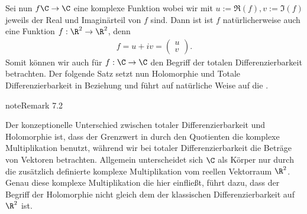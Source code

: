 \documentclass[letterpaper,10pt,german]{jupyterBook}
\begin{document}
\sphinxAtStartPar
Sei nun \(f\C\to\C\) eine komplexe Funktion wobei wir mit \(u:=\Re(f),v:=\Im(f)\) jeweils der Real\sphinxhyphen{} und Imaginärteil von \(f\) sind. Dann ist ist \(f\) natürlicherweise auch eine Funktion \(f:\R^2\to\R^2\), denn
\begin{equation*}
\begin{split}f = u+iv = \begin{pmatrix} u\\ v\end{pmatrix}.\end{split}
\end{equation*}
\sphinxAtStartPar
Somit können wir auch für \(f:\C\to\C\) den Begriff der totalen Differenzierbarkeit betrachten. Der folgende Satz setzt nun Holomorphie und Totale Differenzierbarkeit in Beziehung und führt auf natürliche Weise auf die .
\label{complexanalysis/cauchyriemann:remark-6}
\begin{sphinxadmonition}{note}{Remark 7.2}



\sphinxAtStartPar
Der konzeptionelle Unterschied zwischen totaler Differenzierbarkeit und Holomorphie ist, dass der Grenzwert in {\hyperref[\detokenize{complexanalysis/cauchyriemann:def:holomorph}]{}} durch den Quotienten die komplexe Multiplikation benutzt, während wir bei totaler Differenzierbarkeit die Beträge von Vektoren betrachten. Allgemein unterscheidet sich \(\C\) als Körper nur durch die zusätzlich definierte komplexe Multiplikation vom reellen Vektorraum \(\R^2\). Genau diese komplexe Multiplikation die hier einfließt, führt dazu, dass der Begriff der Holomorphie nicht gleich dem der klassischen Differenzierbarkeit auf \(\R^2\) ist.
\end{sphinxadmonition}
\end{document}
